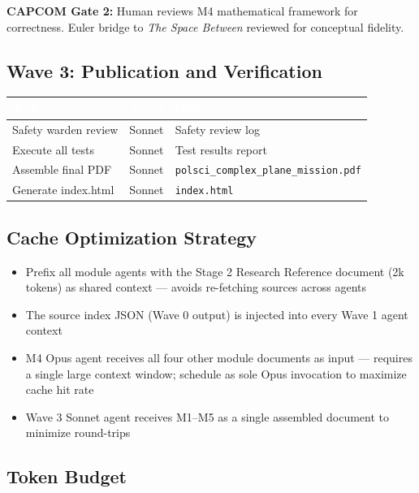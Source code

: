 \documentclass[11pt,letterpaper]{article}
\newcommand{\tableheader}[1]{\textbf{\sffamily\textcolor{white}{#1}}}
\begin{document}
\textbf{CAPCOM Gate 2:} Human reviews M4 mathematical framework for correctness. Euler bridge to \textit{The Space Between} reviewed for conceptual fidelity.

\subsection{Wave 3: Publication and Verification}

\begin{center}
\begin{tabularx}{\textwidth}{L{4cm}L{2cm}X}
\toprule
{}
\tableheader{Task} & \tableheader{Agent} & \tableheader{Output} \\
\midrule
Safety warden review & Sonnet & Safety review log \\
Execute all tests & Sonnet & Test results report \\
Assemble final PDF & Sonnet & \texttt{polsci\_complex\_plane\_mission.pdf} \\
Generate index.html & Sonnet & \texttt{index.html} \\
\bottomrule
\end{tabularx}
\end{center}

\subsection{Cache Optimization Strategy}

\begin{itemize}[noitemsep]
  \item Prefix all module agents with the Stage 2 Research Reference document (2k tokens) as shared context --- avoids re-fetching sources across agents
  \item The source index JSON (Wave 0 output) is injected into every Wave 1 agent context
  \item M4 Opus agent receives all four other module documents as input --- requires a single large context window; schedule as sole Opus invocation to maximize cache hit rate
  \item Wave 3 Sonnet agent receives M1--M5 as a single assembled document to minimize round-trips
\end{itemize}

\subsection{Token Budget}
\end{document}
